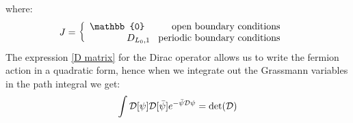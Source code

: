 where:
\begin{equation}
    J = \left\{ \begin{array}{rcl} \mathbb{0} \hspace{10mm} \mbox{open boundary conditions}& \\ D_{L_0, 1}  \hspace{3mm} \mbox{periodic boundary conditions}&  \\ \end{array} \right.
\end{equation}
The expression \eqref{D matrix} for the Dirac operator allows us to write the fermion action in a quadratic form, hence when we integrate out the Grassmann variables in the path integral we get:
\begin{equation}
    \int \mathcal{D}[\psi] \mathcal{D}[\Bar{\psi}] e^{-\Bar{\psi} \mathcal{D} \psi} = \det(\mathcal{D})
\end{equation}

